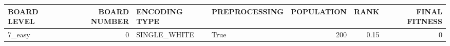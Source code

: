 \begin{tabular}{lrllrrr}
\hline
 BOARD LEVEL   &   BOARD NUMBER & ENCODING TYPE   & PREPROCESSING   &   POPULATION &   RANK &   FINAL FITNESS \\
\hline
 7\_easy        &              0 & SINGLE\_WHITE    & True            &          200 &   0.15 &               0 \\
\hline
\end{tabular}
